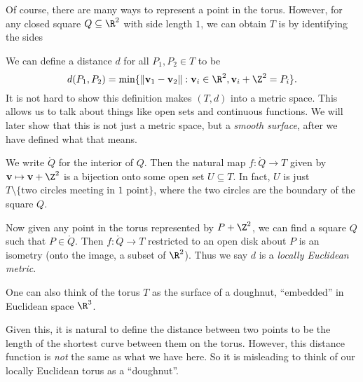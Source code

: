 \documentclass[a4paper]{article}
\begin{document}
Of course, there are many ways to represent a point in the torus. However, for any closed square $Q \subseteq \R^2$ with side length $1$, we can obtain $T$ is by identifying the sides
\begin{center}
\end{center}
We can define a distance $d$ for all $P_1, P_2 \in T$ to be
\[
  d(P_1, P_2) = \min\{\|\mathbf{v}_1 - \mathbf{v}_2\|: \mathbf{v}_i \in \R^2, \mathbf{v}_i + \Z^2 = P_i\}.
\]
It is not hard to show this definition makes $(T, d)$ into a metric space. This allows us to talk about things like open sets and continuous functions. We will later show that this is not just a metric space, but a \emph{smooth surface}, after we have defined what that means.

We write $\mathring{Q}$ for the interior of $Q$. Then the natural map $f: \mathring{Q} \to T$ given by $\mathbf{v} \mapsto \mathbf{v} + \Z^2$ is a bijection onto some open set $U \subseteq T$. In fact, $U$ is just $T \setminus \{\text{two circles meeting in 1 point}\}$, where the two circles are the boundary of the square $Q$.

Now given any point in the torus represented by $P + \Z^2$, we can find a square $Q$ such that $P \in \mathring{Q}$. Then $f: \mathring{Q} \to T$ restricted to an open disk about $P$ is an isometry (onto the image, a subset of $\R^2$). Thus we say $d$ is a \emph{locally Euclidean metric}.

One can also think of the torus $T$ as the surface of a doughnut, ``embedded'' in Euclidean space $\R^3$.
\begin{center}
\end{center}
Given this, it is natural to define the distance between two points to be the length of the shortest curve between them on the torus. However, this distance function is \emph{not} the same as what we have here. So it is misleading to think of our locally Euclidean torus as a ``doughnut''.
\end{document}
